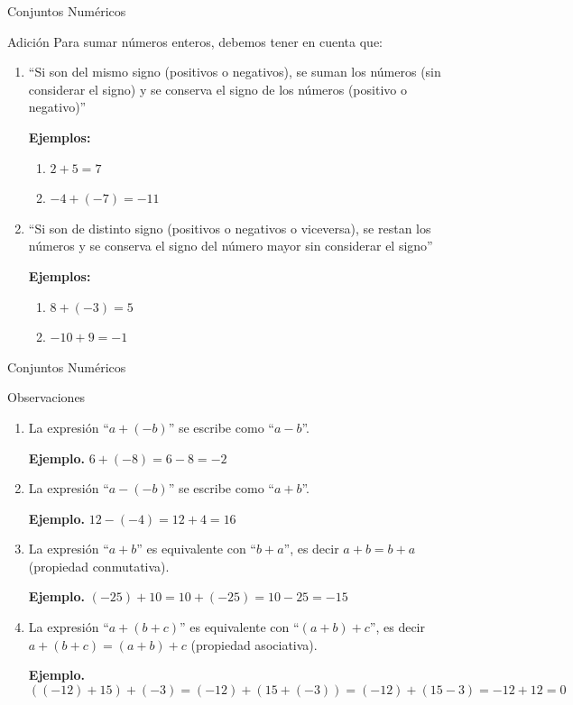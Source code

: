 \documentclass[handout,10pt]{beamer}
\begin{document}
	\begin{frame}{Conjuntos Numéricos}
		\begin{block}{Adición}
			Para sumar números enteros, debemos tener en cuenta que:
			
			\begin{enumerate}
				\item ``Si son del mismo signo (positivos o negativos), se suman los números (sin considerar el signo) y se conserva el signo de los números (positivo o negativo)''
				
				\textbf{Ejemplos:}
				\begin{enumerate}
					\item $2+5=7$
					\item $-4+(-7)=-11$
					\pause
				\end{enumerate}
				
				\item ``Si son de distinto signo (positivos o negativos o viceversa), se restan los números y se conserva el signo del número mayor sin considerar el signo''
				
				\textbf{Ejemplos:}
				\begin{enumerate}
					\item $8+(-3)=5$
					\item $-10+9=-1$
				\end{enumerate}
			\end{enumerate}
		\end{block}
	\end{frame}
	
	\begin{frame}{Conjuntos Numéricos}
		\begin{block}{Observaciones}
			\begin{enumerate}
				\item La expresión ``$a+(-b)$'' se escribe como ``$a-b$''.
				
				\textbf{Ejemplo.} $6+(-8)=6-8=-2$
				\pause
				
				\item La expresión ``$a-(-b)$'' se escribe como ``$a+b$''.
				
				\textbf{Ejemplo.} $12-(-4)=12+4=16$
				\pause
				
				\item La expresión ``$a+b$'' es equivalente con ``$b+a$'', es decir $a+b=b+a$ (propiedad conmutativa).
				
				\textbf{Ejemplo.} $(-25)+10=10+(-25)=10-25=-15$
				\pause
				
				\item La expresión ``$a+(b+c)$'' es equivalente con ``$(a+b)+c$'', es decir
				$a+(b+c)=(a+b)+c$ (propiedad asociativa).
				
				\textbf{Ejemplo.}
				\[
				((-12)+15)+(-3)=(-12)+(15+(-3))=(-12)+(15-3)=-12+12=0
				\]
			\end{enumerate}
		\end{block}
	\end{frame}
	
\end{document}
